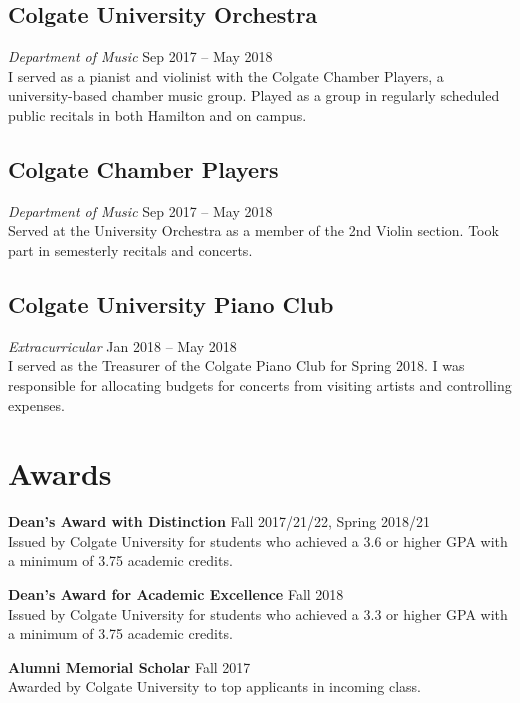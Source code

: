 \documentclass[11pt, letterpaper]{article}
\begin{document}
\begin{multicols}{2}
\subsection{Colgate University Orchestra} 
\noindent \emph{Department of Music} \hfill Sep 2017 – May 2018\\
\noindent I served as a pianist and violinist with the Colgate Chamber Players, a university-based chamber music group. Played as a group in regularly scheduled public recitals in both Hamilton and on campus.

\subsection{Colgate Chamber Players} 
\noindent \emph{Department of Music} \hfill Sep 2017 – May 2018\\
\noindent Served at the University Orchestra as a member of the 2nd Violin section. Took part in semesterly recitals and concerts.

\subsection{Colgate University Piano Club} 
\noindent \emph{Extracurricular} \hfill Jan 2018 – May 2018\\
I served as the Treasurer of the Colgate Piano Club for Spring 2018. I was responsible for allocating budgets for concerts from visiting artists and controlling expenses.
\section{Awards}
\noindent\textbf{Dean's Award with Distinction} \hfill Fall 2017/21/22, Spring 2018/21\\
Issued by Colgate University for students who achieved a 3.6 or higher GPA with a minimum of 3.75 academic credits.

\noindent\textbf{Dean's Award for Academic Excellence} \hfill Fall 2018\\
Issued by Colgate University for students who achieved a 3.3 or higher GPA with a minimum of 3.75 academic credits.

\noindent\textbf{Alumni Memorial Scholar} \hfill Fall 2017\\
Awarded by Colgate University to top applicants in incoming class.

\end{multicols}
\end{document}
